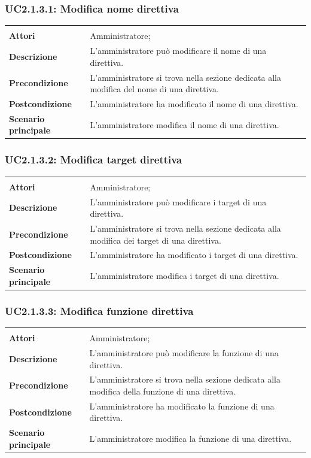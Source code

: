 \subsubsection{UC2.1.3.1: Modifica nome direttiva}
\label{UC2.1.3.1}
\begin{longtable}{l|p{10cm}}
\hline
&\\
\textbf{Attori} & Amministratore;\\[7pt]
\textbf{Descrizione} & L'amministratore può modificare il nome di una direttiva.\\[7pt]
\textbf{Precondizione} & L'amministratore si trova nella sezione dedicata alla modifica del nome di una direttiva.\\[7pt]
\textbf{Postcondizione} & L'amministratore ha modificato il nome di una direttiva.\\[7pt]
\textbf{Scenario principale} & L'amministratore modifica il nome di una direttiva.\\[7pt]\hline
\end{longtable}

\subsubsection{UC2.1.3.2: Modifica target direttiva}
\label{UC2.1.3.2}
\begin{longtable}{l|p{10cm}}
\hline
&\\
\textbf{Attori} & Amministratore;\\[7pt]
\textbf{Descrizione} & L'amministratore può modificare i target di una direttiva.\\[7pt]
\textbf{Precondizione} & L'amministratore si trova nella sezione dedicata alla modifica dei target di una direttiva.\\[7pt]
\textbf{Postcondizione} & L'amministratore ha modificato i target di una direttiva.\\[7pt]
\textbf{Scenario principale} & L'amministratore modifica i target di una direttiva.\\[7pt]\hline
\end{longtable}

\subsubsection{UC2.1.3.3: Modifica funzione direttiva}
\label{UC2.1.3.3}
\begin{longtable}{l|p{10cm}}
\hline
&\\
\textbf{Attori} & Amministratore;\\[7pt]
\textbf{Descrizione} & L'amministratore può modificare la funzione di una direttiva.\\[7pt]
\textbf{Precondizione} & L'amministratore si trova nella sezione dedicata alla modifica della funzione di una direttiva.\\[7pt]
\textbf{Postcondizione} & L'amministratore ha modificato la funzione di una direttiva.\\[7pt]
\textbf{Scenario principale} & L'amministratore modifica la funzione di una direttiva.\\[7pt]\hline
\end{longtable}

